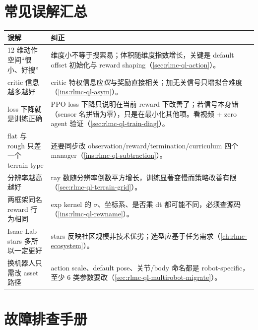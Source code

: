 \section{常见误解汇总}
\label{sec:rlmc-ql-myths}

\begin{center}
\small
\begin{tabular}{@{}p{5.2cm}p{8.5cm}@{}}
\toprule
误解 & 纠正 \\
\midrule
12 维动作空间“很小、好搜” & 维度小不等于搜索易；体积随维度指数增长，关键是 default offset 初始化与 reward shaping（\cref{sec:rlmc-ql-action}）。 \\
critic 信息越多越好 & critic 特权信息应\emph{仅}与奖励直接相关；加无关信号只增拟合难度（\cref{ins:rlmc-ql-asym}）。 \\
loss 下降就是训练正确 & PPO loss 下降只说明在当前 reward 下改善了；若信号本身错（sensor 名拼错为零），只是在最小化其他项。看视频 + zero agent 验证（\cref{sec:rlmc-ql-train-diag}）。 \\
flat 与 rough 只差一个 terrain type & 还要同步改 observation/reward/termination/curriculum 四个 manager（\cref{ins:rlmc-ql-subtraction}）。 \\
分辨率越高越好 & ray 数随分辨率倒数平方增长，训练显著变慢而策略改善有限（\cref{sec:rlmc-ql-terrain-grid}）。 \\
两框架同名 reward 行为相同 & exp kernel 的 $\sigma$、坐标系、是否乘 dt 都可能不同，必须查源码（\cref{ins:rlmc-ql-rewname}）。 \\
Isaac Lab stars 多所以一定更好 & stars 反映社区规模非技术优劣；选型应基于任务需求（\cref{ch:rlmc-ecosystem}）。 \\
换机器人只需改 asset 路径 & action scale、default pose、关节/body 命名都是 robot-specific，至少 6 类参数要改（\cref{sec:rlmc-ql-multirobot-migrate}）。 \\
\bottomrule
\end{tabular}
\end{center}

\section{故障排查手册}
\label{sec:rlmc-ql-trouble}

